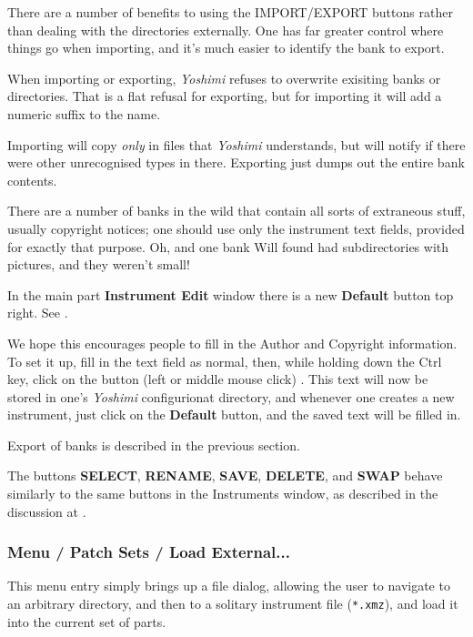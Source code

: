    There are a number of benefits to using the IMPORT/EXPORT buttons
   rather than dealing with the directories externally.
   One has far greater control where things go when
   importing, and it's much easier to identify the bank to export.

   When importing or exporting,
   \textsl{Yoshimi} refuses to overwrite exisiting banks or
   directories. That is a flat refusal for exporting, but for importing it will
   add a numeric suffix to the name.

   Importing will copy \textsl{only} in files that
   \textsl{Yoshimi} understands, but will notify
   if there were other unrecognised types in there.
   Exporting just dumps out the entire bank contents.

   There are a number of banks in the wild that contain all sorts of extraneous
   stuff, usually copyright notices; one should use only the instrument
   text fields, provided for exactly that purpose.
   Oh, and one bank Will found had subdirectories with pictures,
   and they weren't small!

   In the main part \textbf{Instrument Edit} window there is a new
   \textbf{Default} button top right.
   See .

   We hope this encourages people
   to fill in the Author and Copyright information.
   To set it up, fill in the text field as normal,
   then, while holding down the Ctrl key, click on the button
   (left or middle mouse click) . This text will now be stored in
   one's
   \textsl{Yoshimi} configurionat directory,
   and whenever one creates a new instrument, just
   click on the \textbf{Default} button, and the saved text will be
   filled in.

   Export of banks is described in the previous section.

   The buttons \textbf{SELECT}, \textbf{RENAME}, \textbf{SAVE},
   \textbf{DELETE}, and \textbf{SWAP} behave similarly to the same buttons in
   the Instruments window, as
   described in the discussion at
   .

\subsubsection{Menu / Patch Sets / Load External...}
\label{subsubsec:menu_patch_sets_load}

   This menu entry simply brings up a file dialog, allowing the user to
   navigate to an arbitrary directory, and then to a solitary instrument file
   (\texttt{*.xmz}), and load it into the current set of parts.

